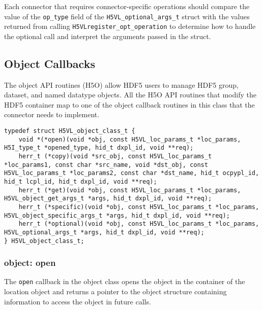 Each connector that requires connector-specific operations should compare the
value of the {\tt op\_type} field of the {\tt H5VL\_optional\_args\_t} struct
with the values returned from calling {\tt H5VLregister\_opt\_operation} to
determine how to handle the optional call and interpret the arguments passed
in the struct.



\subsection{Object Callbacks}
The object API routines (H5O) allow HDF5 users to manage HDF5 group,
dataset, and named datatype objects. All the H5O API routines that
modify the HDF5 container map to one of the object callback routines
in this class that the connector needs to implement.

\begin{lstlisting}[caption={Structure for object callback routines, H5VLconnector.h}, captionpos=b, label={lst:H5Oclass}]
typedef struct H5VL_object_class_t {                                             
    void *(*open)(void *obj, const H5VL_loc_params_t *loc_params, H5I_type_t *opened_type, hid_t dxpl_id, void **req);                                    
    herr_t (*copy)(void *src_obj, const H5VL_loc_params_t *loc_params1, const char *src_name, void *dst_obj, const H5VL_loc_params_t *loc_params2, const char *dst_name, hid_t ocpypl_id, hid_t lcpl_id, hid_t dxpl_id, void **req);   
    herr_t (*get)(void *obj, const H5VL_loc_params_t *loc_params, H5VL_object_get_args_t *args, hid_t dxpl_id, void **req);                 
    herr_t (*specific)(void *obj, const H5VL_loc_params_t *loc_params, H5VL_object_specific_args_t *args, hid_t dxpl_id, void **req);            
    herr_t (*optional)(void *obj, const H5VL_loc_params_t *loc_params, H5VL_optional_args_t *args, hid_t dxpl_id, void **req); 
} H5VL_object_class_t; 
\end{lstlisting}

\subsubsection{object: open}
The \texttt{open} callback in the object class opens the object in
the container of the location object and returns a pointer to the
object structure containing information to access the object in future
calls.\bigskip

